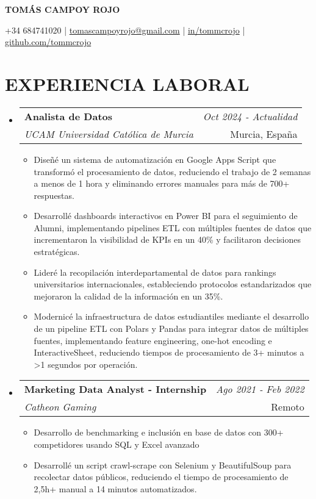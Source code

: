 \documentclass[a4paper,11pt]{article}
\makeatletter
\newcommand{\resumeSubheading}[4]{
\vspace{0.5mm}\item
    \begin{tabular*}{0.98\textwidth}[t]{l@{\extracolsep{\fill}}r}
        \textbf{#1} & \textit{\footnotesize{#4}} \\
        \textit{\footnotesize{#3}} &  \footnotesize{#2}\\
    \end{tabular*}
    \vspace{-2.4mm}
}
\newcommand{\resumeSubHeadingListStart}{\begin{itemize}[leftmargin=*,labelsep=1mm]}
\newcommand{\resumeItemListStart}{\begin{itemize}[leftmargin=*,labelsep=1mm,itemsep=0.5mm]\small}
\newcommand{\resumeSubHeadingListEnd}{\end{itemize}\vspace{-8mm}}
\newcommand{\resumeItemListEnd}{\end{itemize}\vspace{-2mm}}
\newcommand{\socialicon}[1]{\raisebox{-0.05em}{\resizebox{!}{1em}{#1}}}
\newcommand{\headerfontiii}{\fontfamily{ppl}\selectfont} %
\makeatother
\begin{document}
\headerfontiii

\begin{center}
    {\LARGE\textbf{TOMÁS CAMPOY ROJO}}
\end{center}
\vspace{-4mm}

\begin{center}
    \small{
    +34 684741020 | \href{mailto:tomascampoyrojo@gmail.com}{tomascampoyrojo@gmail.com} | 
    \socialicon{\faLinkedin} \href{https://www.linkedin.com/in/tommcrojo/}{in/tommcrojo} | 
    \socialicon{\faGithub} \href{https://github.com/tommcrojo}{github.com/tommcrojo}
    }
\end{center}
\vspace{-5mm}

\section{\textbf{EXPERIENCIA LABORAL}}
\vspace{0mm}
  \resumeSubHeadingListStart
  \resumeSubheading
      {Analista de Datos}{Murcia, España}
      {UCAM Universidad Católica de Murcia}{Oct 2024 - Actualidad}
      \resumeItemListStart
\item Diseñé un sistema de automatización en Google Apps Script que transformó el procesamiento de datos, reduciendo el trabajo de 2 semanas a menos de 1 hora y eliminando errores manuales para más de 700+ respuestas.
\item Desarrollé dashboards interactivos en Power BI para el seguimiento de Alumni, implementando pipelines ETL con múltiples fuentes de datos que incrementaron la visibilidad de KPIs en un 40\% y facilitaron decisiones estratégicas.
\item Lideré la recopilación interdepartamental de datos para rankings universitarios internacionales, estableciendo protocolos estandarizados que mejoraron la calidad de la información en un 35\%.
\item Modernicé la infraestructura de datos estudiantiles mediante el desarrollo de un pipeline ETL con Polars y Pandas para integrar datos de múltiples fuentes, implementando feature engineering, one-hot encoding e InteractiveSheet, reduciendo tiempos de procesamiento de 3+ minutos a >1 segundos por operación.
      \resumeItemListEnd 
  \resumeSubheading
    {Marketing Data Analyst - Internship}{Remoto}
    {Catheon Gaming}{Ago 2021 - Feb 2022}
    \resumeItemListStart
      \item Desarrollo de benchmarking e inclusión en base de datos con 300+ competidores usando SQL y Excel avanzado
      \item Desarrollé un script crawl-scrape con Selenium y BeautifulSoup para recolectar datos públicos, reduciendo el tiempo de procesamiento de 2,5h+ manual a 14 minutos automatizados.
    \resumeItemListEnd
  \resumeSubHeadingListEnd
\vspace{4mm}
\end{document}

